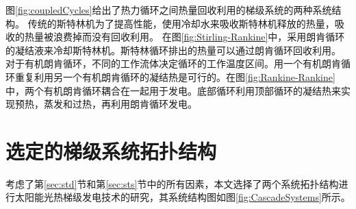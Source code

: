 图\ref{fig:coupledCycles}给出了热力循环之间热量回收利用的梯级系统的两种系统结构。
传统的斯特林机为了提高性能，使用冷却水来吸收斯特林机释放的热量，吸收的热量被浪费掉而没有回收利用。
在图\ref{fig:Stirling-Rankine}中，采用朗肯循环的凝结液来冷却斯特林机。斯特林循环排出的热量可以通过朗肯循环回收利用。
对于有机朗肯循环，不同的工作流体决定循环的工作温度区间。用一个有机朗肯循环重复利用另一个有机朗肯循环的凝结热是可行的。在图\ref{fig:Rankine-Rankine}中，两个有机朗肯循环耦合在一起用于发电。底部循环利用顶部循环的凝结热来实现预热，蒸发和过热，再利用朗肯循环发电。

\section{选定的梯级系统拓扑结构}
\label{sec:sst}
考虑了第\ref{sec:std}节和第\ref{sec:sts}节中的所有因素，本文选择了两个系统拓扑结构进行太阳能光热梯级发电技术的研究，其系统结构图如图\ref{fig:CascadeSystems}所示。


